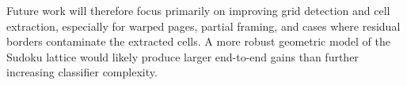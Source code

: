 \documentclass[10pt,twocolumn,letterpaper]{article}
\begin{document}
Future work will therefore focus primarily on improving grid detection and cell extraction, especially for warped pages, partial framing, and cases where residual borders contaminate the extracted cells. A more robust geometric model of the Sudoku lattice would likely produce larger end-to-end gains than further increasing classifier complexity.

{\small


}
\end{document}
